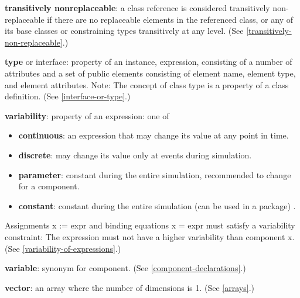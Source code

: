 \documentclass[../MLS.tex]{subfiles}
\begin{document}
\textbf{transitively nonreplaceable}: a class reference is considered
transitively non-replaceable if there are no replaceable elements in the
referenced class, or any of its base classes or constraining types
transitively at any level. (See \autoref{transitively-non-replaceable}.)

\textbf{type} or interface: property of an instance, expression, consisting of a number of attributes and a set of public
elements consisting of element name, element type, and element
attributes. Note: The concept of class type is a property of a class
definition. (See \autoref{interface-or-type}.)

\textbf{variability}: property of an expression: one of
\begin{itemize}
\item \textbf{continuous}: an expression that may change its value at any
point in time.
\item \textbf{discrete}: may change its value only at events during
simulation.
\item \textbf{parameter}: constant during the entire simulation, recommended
to change for a component.
\item \textbf{constant}: constant during the entire simulation (can be used
in a package) .
\end{itemize}

Assignments x := expr and binding equations x = expr must satisfy a
variability constraint: The expression must not have a higher
variability than component x. (See \autoref{variability-of-expressions}.)

\textbf{variable}: synonym for component. (See \autoref{component-declarations}.)

\textbf{vector}: an array where the number of dimensions is 1. (See
\autoref{arrays}.)
\end{document}
